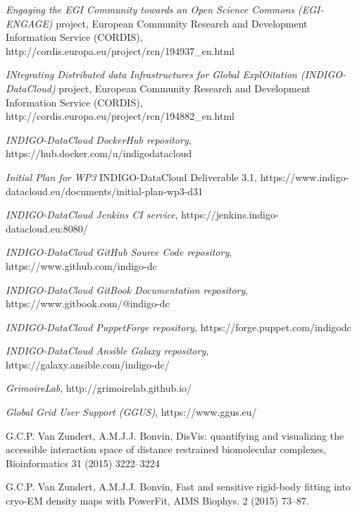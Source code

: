 \documentclass[journal]{IEEEtran}
\begin{document}
\begin{thebibliography}{1}
\emph{Engaging the EGI Community towards an Open Science Commons (EGI-ENGAGE)}
project, European Community Research and Development Information Service
(CORDIS), http://cordis.europa.eu/project/rcn/194937\_en.html

\emph{INtegrating Distributed data Infrastructures for Global ExplOitation
(INDIGO-DataCloud)} project, European Community Research and Development
Information Service (CORDIS),
http://cordis.europa.eu/project/rcn/194882\_en.html

\emph{INDIGO-DataCloud DockerHub repository},
https://hub.docker.com/u/indigodatacloud

\emph{Initial Plan for WP3} INDIGO-DataCloud Deliverable 3.1,
https://www.indigo-datacloud.eu/documents/initial-plan-wp3-d31

\emph{INDIGO-DataCloud Jenkins CI service},
https://jenkins.indigo-datacloud.eu:8080/

\emph{INDIGO-DataCloud GitHub Source Code repository},
https://www.github.com/indigo-dc

\emph{INDIGO-DataCloud GitBook Documentation repository},
https://www.gitbook.com/@indigo-dc

\emph{INDIGO-DataCloud PuppetForge repository},
https://forge.puppet.com/indigodc

\emph{INDIGO-DataCloud Ansible Galaxy repository},
https://galaxy.ansible.com/indigo-dc/

\emph{GrimoireLab}, http://grimoirelab.github.io/

\emph{Global Grid User Support (GGUS)}, https://www.ggus.eu/

 G.C.P. Van Zundert, A.M.J.J. Bonvin,
DisVis: quantifying and visualizing the accessible interaction space of distance
restrained biomolecular complexes, Bioinformatics 31 (2015) 3222–3224

 G.C.P. Van Zundert, A.M.J.J. Bonvin,
Fast and sensitive rigid-body fitting into cryo-EM density maps with PowerFit,
AIMS Biophys. 2 (2015) 73–87.

\end{thebibliography}
\end{document}
